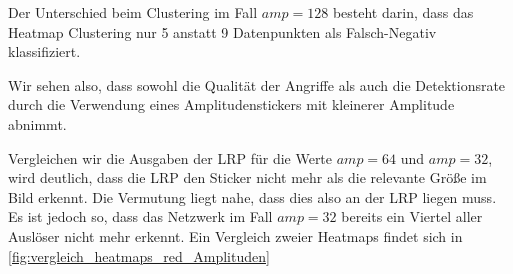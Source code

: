 \documentclass[11pt,a4paper]{article}
\numberwithin{equation}{section}
\begin{document}
Der Unterschied beim Clustering im Fall $amp=128$ besteht darin, dass das Heatmap Clustering nur 5 anstatt 9 Datenpunkten als Falsch-Negativ klassifiziert.
	
	Wir sehen also, dass sowohl die Qualität der Angriffe als auch die Detektionsrate durch die Verwendung eines Amplitudenstickers mit kleinerer Amplitude abnimmt.
	
	Vergleichen wir die Ausgaben der LRP für die Werte $amp=64$ und $amp=32$, wird deutlich, dass die LRP den Sticker nicht mehr als die relevante Größe im Bild erkennt. Die Vermutung liegt nahe, dass dies also an der LRP liegen muss. Es ist jedoch so, dass das Netzwerk im Fall $amp=32$ bereits ein Viertel aller Auslöser nicht mehr erkennt. Ein Vergleich zweier Heatmaps findet sich in \autoref{fig:vergleich_heatmaps_red_Amplituden}
	
\end{document}

